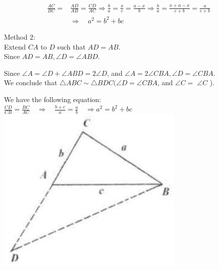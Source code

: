 \documentclass[10pt]{article}
\begin{document}
\[
\begin{aligned}
\frac{A C}{B C}= & \frac{A D}{A B}=\frac{C D}{A C} \Rightarrow \frac{b}{a}=\frac{x}{c}=\frac{a-x}{b} \Rightarrow \frac{b}{a}=\frac{x+a-x}{c+b}=\frac{a}{c+b} \\
& \Rightarrow \quad a^{2}=b^{2}+b c
\end{aligned}
\]

Method 2:\\
Extend \(C A\) to \(D\) such that \(A D=A B\).\\
Since \(A D=A B, \angle D=\angle A B D\).


Since \(\angle A=\angle D+\angle A B D=2 \angle D\), and \(\angle A=2 \angle C B A, \angle D=\angle C B A\).\\
We conclude that \(\triangle A B C \sim \triangle B D C(\angle D=\angle C B A\), and \(\angle C=\) \(\angle C\) ).

We have the following equation:\\
\(\frac{C D}{C B}=\frac{B C}{A C} \quad \Rightarrow \quad \frac{b+c}{a}=\frac{a}{b} \quad \Rightarrow a^{2}=b^{2}+b c\)\\
\includegraphics[max width=\textwidth, center]{2025_04_17_97bc1f7e44d93c271a88g-072}
\end{document}
